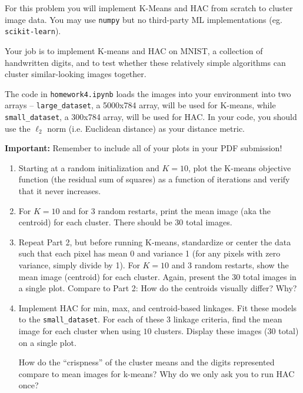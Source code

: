 \documentclass[submit]{../harvardml}
\begin{document}
\begin{problem}

  For this problem you will implement K-Means and HAC from scratch to cluster image data. You may use \texttt{numpy} but no third-party ML implementations (eg. \texttt{scikit-learn}).

  Your job is to implement K-means and HAC on MNIST, a collection of handwritten digits, and to test whether these relatively simple algorithms can cluster similar-looking images together.

  The code in \texttt{homework4.ipynb} loads the images into your environment into two arrays -- \texttt{large\_dataset}, a 5000x784 array, will be used for K-means, while \texttt{small\_dataset}, a 300x784 array, will be used for HAC. In your code, you should use the $\ell_2$ norm (i.e. Euclidean distance) as your distance metric.

  \textbf{Important:} Remember to include all of your plots in your PDF submission!

  \begin{enumerate}
    \item Starting at a random initialization and $K = 10$, plot the
      K-means objective function (the residual sum of squares) as a
      function of iterations and verify that it never increases.

    \item For $K=10$ and for 3 random restarts, print the mean image (aka
      the centroid) for each cluster. There should be 30 total images.

    \item Repeat Part 2, but before running K-means, standardize or center
      the data such that each pixel has mean 0 and variance 1 (for any
      pixels with zero variance, simply divide by 1). For $K=10$ and 3
      random restarts, show the mean image (centroid) for each
      cluster. Again, present the 30 total images in a single
      plot. Compare to Part 2: How do the centroids visually differ? Why?

    \item Implement HAC for min, max, and centroid-based linkages. Fit
      these models to the \texttt{small\_dataset}.  For each of these 3
      linkage criteria, find the mean image for each cluster when using
      $10$ clusters. Display these images (30 total) on a single plot.

      How do the ``crispness'' of the cluster means and the digits
      represented compare to mean images for k-means?  
      Why do we only ask you to run HAC once?  


\end{enumerate}
\end{problem}
\end{document}
